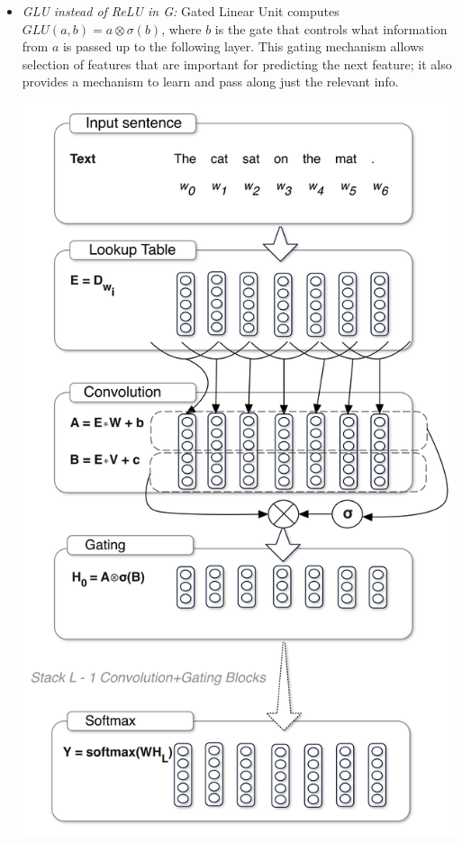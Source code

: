 \documentclass[12pt]{article}
\begin{document}
\begin{itemize}
{\begin{minipage}[t]{0.4\textwidth}
		\end{minipage}	
	}
	\item {
		\begin{minipage}[t]{0.5\textwidth}
			\textit{GLU instead of ReLU in G:} Gated Linear Unit computes $GLU(a,b) = a \otimes \sigma(b)$, where $b$ is the gate that controls
			what information from $a$ is passed up to the following layer. This gating mechanism allows selection of features that are important
			for predicting the next feature; it also provides a mechanism to learn and pass along just the relevant info.
		\end{minipage}
		\hspace{0.02\linewidth}
		\begin{minipage}[t]{0.4\textwidth} 
			\vspace{-0.5cm}
			\includegraphics[width=1\textwidth]{Images/GLU.png}
		\end{minipage}
	}
\end{itemize} 
\end{document}
